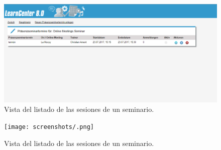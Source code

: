 \begin{figure}[h]
	\begin{center}
		\includegraphics[width=\textwidth]{screenshots/listar_sesiones_seminario.png}
		\caption{Vista del listado de las sesiones de un seminario.} \label{fig:listarSesiones}
	\end{center}
\end{figure}

\begin{figure}[h]
	\begin{center}
		\texttt{[image: screenshots/.png]}
		\caption{Vista del listado de las sesiones de un seminario.} \label{fig:listarSesiones}
	\end{center}
\end{figure}

















